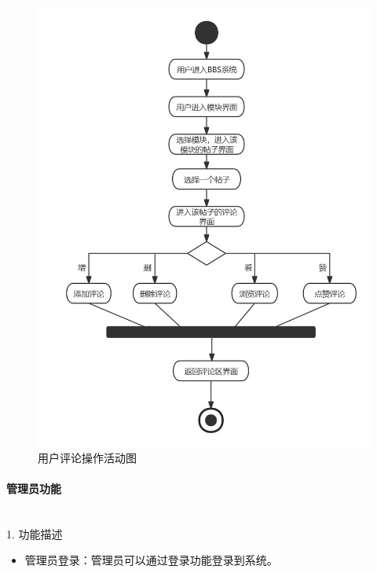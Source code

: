 \documentclass[UTF8]{ctexart}
\newcommand{\subsubsubsection}[1]{\paragraph{#1}\mbox{}\\} %
\begin{document}
\begin{figure}[H]
  \centering
  \includegraphics[scale=0.25]{活动图/用户评论操作活动图.jpg}
  \caption{用户评论操作活动图}
\end{figure}

\subsubsubsection{管理员功能}

1. 功能描述
\begin{itemize}
  \item 管理员登录：管理员可以通过登录功能登录到系统。
\end{itemize}
\end{document}
